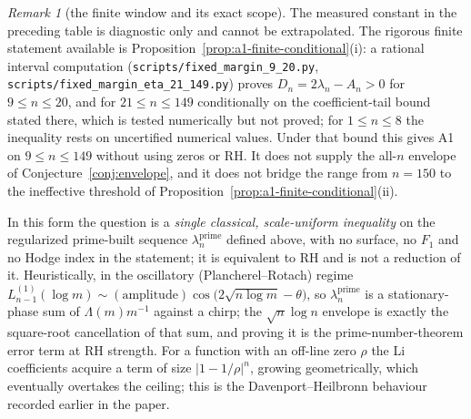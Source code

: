 \documentclass[11pt]{amsart}
\theoremstyle{definition}
\theoremstyle{remark}
\newtheorem{remark}[theorem]{Remark}
\theoremstyle{definition}
\begin{document}
\begin{remark}[the finite window and its exact scope]\label{rmk:finite-window}
The measured constant in the preceding table is diagnostic only and cannot be extrapolated.  The
rigorous finite statement available is Proposition~\ref{prop:a1-finite-conditional}(i): a rational
interval computation (\texttt{scripts/fixed\_margin\_9\_20.py}, \texttt{scripts/fixed\_margin\_eta\_21\_149.py})
proves $D_n=2\lambda_n-A_n>0$ for $9\le n\le20$, and for $21\le n\le149$ conditionally on the
coefficient-tail bound stated there, which is tested numerically but not proved; for $1\le n\le8$ the
inequality rests on uncertified numerical values.  Under that bound this gives A1 on $9\le n\le149$
without using zeros or RH.  It does not supply the all-$n$ envelope of
Conjecture~\ref{conj:envelope}, and it does not bridge the range from $n=150$ to the ineffective threshold of
Proposition~\ref{prop:a1-finite-conditional}(ii).
\end{remark}

In this form the question is a \emph{single classical, scale-uniform inequality} on the regularized
prime-built sequence $\lambda_n^{\mathrm{prime}}$ defined above, with no surface, no $F_1$ and no Hodge
index in the statement; it is equivalent to RH and is not a reduction of it.  Heuristically, in the oscillatory (Plancherel--Rotach) regime
$L_{n-1}^{(1)}(\log m)\sim (\text{amplitude})\cos\!\big(2\sqrt{n\log m}-\theta\big)$, so
$\lambda_n^{\mathrm{prime}}$ is a stationary-phase sum of $\Lambda(m)m^{-1}$ against a chirp; the
$\sqrt n\log n$ envelope is exactly the square-root cancellation of that sum, and proving it is the
prime-number-theorem error term at RH strength.  For a function with an off-line zero $\rho$ the Li
coefficients acquire a term of size $|1-1/\rho|^n$, growing geometrically, which eventually overtakes
the ceiling; this is the Davenport--Heilbronn behaviour recorded earlier in the paper.
\end{document}
